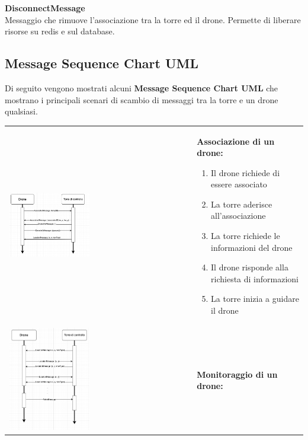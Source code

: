 \documentclass[a4paper, 11pt]{article}
\begin{document}
\textbf{DisconnectMessage}\\
Messaggio che rimuove l'associazione tra la torre ed il drone. Permette di liberare risorse su redis e sul database.
\newpage

\subsection{Message Sequence Chart UML}
Di seguito vengono mostrati alcuni \textbf{Message Sequence Chart UML} che mostrano i principali scenari di scambio di messaggi tra la torre e un drone qualsiasi.



\begin{tabular}{m{} p{}}
    \includegraphics[width=0.45\textwidth]{image/associatedUML_MSC.png}&\textbf{Associazione di un drone:}
    \begin{enumerate}
        \item Il drone richiede di essere associato 
        \item La torre aderisce all'associazione
        \item La torre richiede le informazioni del drone
        \item Il drone risponde alla richiesta di informazioni 
        \item La torre inizia a guidare il drone 
    \end{enumerate}\\
    \includegraphics[width=0.45\textwidth]{image/monitoringUML_MSC.png} &\textbf{Monitoraggio di un drone:}

\end{tabular}
\end{document}
